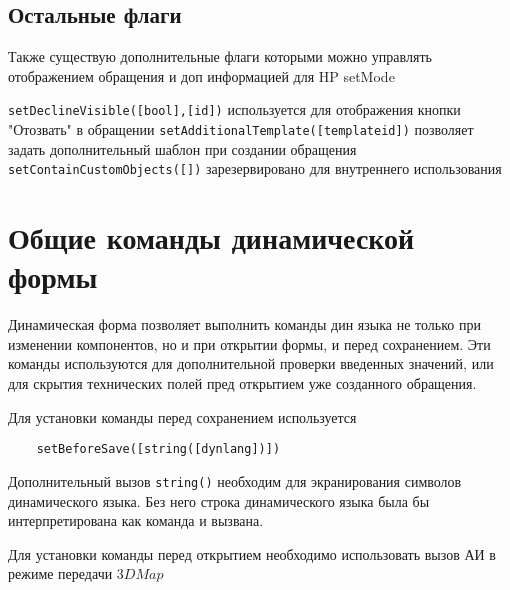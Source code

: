 \documentclass[../index.tex]{subfiles}
\begin{document}
\subsection{Остальные флаги}
Также существую дополнительные флаги которыми можно управлять отображением обращения и доп информацией для HP setMode

\verb|setDeclineVisible([bool],[id])| используется для отображения кнопки "Отозвать" в обращении
\verb|setAdditionalTemplate([templateid])| позволяет задать дополнительный шаблон при создании обращения
\verb|setContainCustomObjects([])| зарезервировано для внутреннего использования

\section{Общие команды динамической формы}
Динамическая форма позволяет выполнить команды дин языка не только при изменении компонентов, но и при открытии формы,
и перед сохранением. Эти команды используются для дополнительной проверки введенных значений, или для скрытия 
технических полей пред открытием уже созданного обращения.

Для установки команды перед сохранением используется
\begin{verbatim}
    setBeforeSave([string([dynlang])])
\end{verbatim}
Дополнительный вызов \verb|string()| необходим для экранирования символов динамического языка. Без него строка динамического языка
была бы интерпретирована как команда и вызвана.

Для установки команды перед открытием необходимо использовать вызов АИ в режиме передачи $3DMap$
\end{document}
